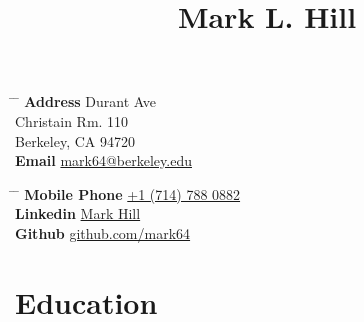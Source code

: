 \documentclass[10pt]{article} %
\begin{document}

\title{Mark L. Hill} %


\parbox{0.5\textwidth}{ %
\begin{tabbing} %
\hspace{3cm} \= \hspace{4cm} \= \kill %
{\bf Address}  Durant Ave \\ %
\> Christain Rm. 110 \\ %
\> Berkeley, CA 94720 \\ %
{\bf Email} \> \href{mailto:mark64@berkeley.edu}{mark64@berkeley.edu} %
\end{tabbing}}
\hfill %
\parbox{0.5\textwidth}{ %
\begin{tabbing} %
\hspace{3cm} \= \hspace{4cm} \= \kill %
{\bf Mobile Phone} \> \href{tel:+17147880882}{+1 (714) 788 0882} \\ %
{\bf Linkedin} \> \href{https://www.linkedin.com/in/mark-h-6ab768146}{Mark Hill} \\ %
{\bf Github} \> \href{https://github.com/mark64} {github.com/mark64} \\ %
\end{tabbing}}



\section{Education}

\end{document}
